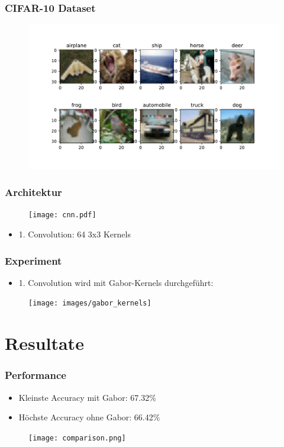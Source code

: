 \documentclass{beamer}
\begin{document}
\begin{frame}
\frametitle{CIFAR-10 Dataset}
	\begin{figure}
		\centering
		\includegraphics[width=\linewidth]{images/cifar10}
		\label{fig:cifar10}
	\end{figure}
	
\end{frame}


\begin{frame}
\frametitle{Architektur}
\begin{figure}
	\centering
	\texttt{[image: cnn.pdf]}
	\label{fig:cnn}
\end{figure}
\begin{itemize}
	\item[] 1. Convolution: 64 3x3 Kernels
\end{itemize}

\end{frame}


\begin{frame}
\frametitle{Experiment}
	\begin{itemize}
		 \item [] 1. Convolution wird mit Gabor-Kernels durchgeführt:
	\end{itemize}
	\begin{figure}
		\centering
		\texttt{[image: images/gabor\_kernels]}
		\label{fig:gaborkernels}
	\end{figure}
	
\end{frame}


\section{Resultate}

\begin{frame}
\frametitle{Performance}
\begin{itemize}
	\item[] Kleinste Accuracy mit Gabor: 67.32\%
	\item[] Höchste Accuracy ohne Gabor: 66.42\%
\end{itemize}
\begin{figure}
	\centering
	\texttt{[image: comparison.png]}
	\label{fig:comparison}
\end{figure}

\end{frame}
\end{document}
